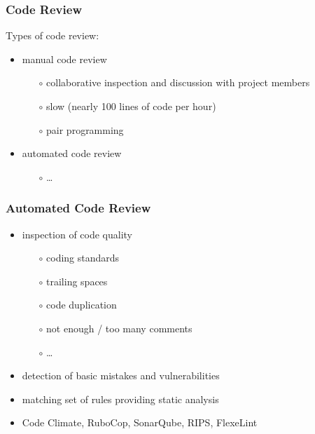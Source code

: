 \documentclass[10pt,xcolor=pdflatex]{beamer}
\begin{document}
\begin{frame}\frametitle{Code Review}
    Types of code review:\\[0.5em]
    \begin{itemize}
        \item manual code review
            \begin{itemize}
                \item[$\circ$] collaborative inspection and discussion with project members\\[0.25em]
                \item[$\circ$] slow (nearly 100 lines of code per hour)\\[0.25em]
                \item[$\circ$] pair programming\\[1em]
            \end{itemize}
        \item automated code review
            \begin{itemize}
                \item[$\circ$] \dots
            \end{itemize}
            
    \end{itemize}
\end{frame}

\begin{frame}\frametitle{Automated Code Review}
    \begin{itemize}
        \item inspection of code quality
            \begin{itemize}
                \item[$\circ$] coding standards
                \item[$\circ$] trailing spaces
                \item[$\circ$] code duplication
                \item[$\circ$] not enough / too many comments
                \item[$\circ$] \dots\\[1em]
            \end{itemize}
        \item detection of basic mistakes and vulnerabilities\\[1em]
        \item matching set of rules providing static analysis\\[1em]
        \item Code Climate, RuboCop, SonarQube, RIPS, FlexeLint
    \end{itemize}
\end{frame}
\end{document}
